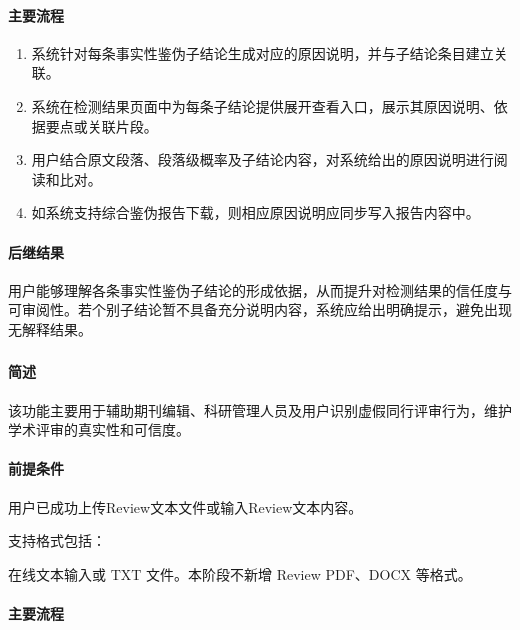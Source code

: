 \paragraph*{主要流程}

\begin{enumerate}
    \item 系统针对每条事实性鉴伪子结论生成对应的原因说明，并与子结论条目建立关联。
    \item 系统在检测结果页面中为每条子结论提供展开查看入口，展示其原因说明、依据要点或关联片段。
    \item 用户结合原文段落、段落级概率及子结论内容，对系统给出的原因说明进行阅读和比对。
    \item 如系统支持综合鉴伪报告下载，则相应原因说明应同步写入报告内容中。
\end{enumerate}

\paragraph*{后继结果}

用户能够理解各条事实性鉴伪子结论的形成依据，从而提升对检测结果的信任度与可审阅性。若个别子结论暂不具备充分说明内容，系统应给出明确提示，避免出现无解释结果。

\subsubsection{}

\paragraph*{简述}


该功能主要用于辅助期刊编辑、科研管理人员及用户识别虚假同行评审行为，维护学术评审的真实性和可信度。

\paragraph*{前提条件}

用户已成功上传Review文本文件或输入Review文本内容。

支持格式包括：

在线文本输入或 TXT 文件。本阶段不新增 Review PDF、DOCX 等格式。

\paragraph*{主要流程}

